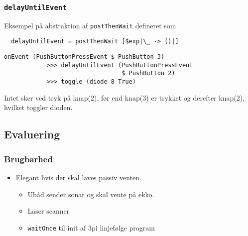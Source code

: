 \documentclass[t]{beamer}
\begin{document}
\begin{frame}[fragile]
  \frametitle{\texttt{delayUntilEvent}}

  Eksempel på abstraktion af \texttt{postThenWait} defineret som

\begin{verbatim}
  delayUntilEvent = postThenWait [$exp|\_ -> ()|]
\end{verbatim}

  \begin{example}
\begin{verbatim}
onEvent (PushButtonPressEvent $ PushButton 3) 
            >>> delayUntilEvent (PushButtonPressEvent 
                                 $ PushButton 2)
            >>> toggle (diode 8 True)
\end{verbatim}
  \end{example}

  Intet sker ved tryk på knap(2), før end knap(3) er trykket og derefter
  knap(2), hvilket toggler dioden.

\end{frame}


\subsection{Evaluering}

\begin{frame}
  \frametitle{Brugbarhed}
  
  \begin{itemize}
  \item Elegant hvis der skal laves passiv venten.
    \begin{itemize}
    \item Ubåd sender sonar og skal vente på ekko.

    \item Laser scanner

    \item \texttt{waitOnce} til init af 3pi linjefølge program
    \end{itemize}
  \end{itemize}
\end{frame}
\end{document}
